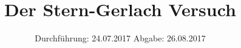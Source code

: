 

\subject{V25}
\title{Der Stern-Gerlach Versuch}
\date{
  Durchführung: 24.07.2017
  \hspace{3em}
  Abgabe: 26.08.2017
}



\maketitle
\thispagestyle{empty}
\tableofcontents
\newpage







\printbibliography








